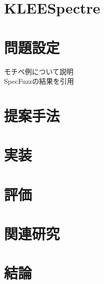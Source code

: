 \documentclass[submit]{ipsj}
\begin{document}
\section{KLEESpectre}


\section{問題設定}
モチベ例について説明 \\
SpecFuzzの結果を引用 \\

\section{提案手法}

\section{実装}

\section{評価}

\section{関連研究}

\section{結論}



\end{document}
